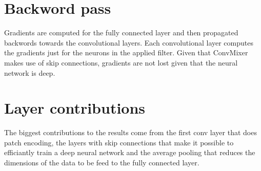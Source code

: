 \documentclass{article}
\begin{document}
\section{Backword pass}
Gradients are computed for the fully connected layer and then propagated backwords towards the convolutional layers. Each convolutional layer computes the gradients just for the neurons in the applied filter. Given that ConvMixer makes use of skip connections, gradients are not lost given that the neural network is deep.


\section{Layer contributions}
The biggest contributions to the results come from the first conv layer that does patch encoding, the layers with skip connections that make it possible to efficiantly train a deep neural network and the average pooling that reduces the dimensions of the data to be feed to the fully connected layer.
\end{document}

